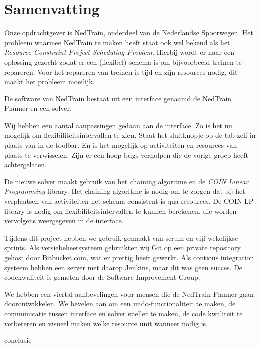 \section*{Samenvatting}

Onze opdrachtgever is NedTrain, onderdeel van de Nederlandse Spoorwegen. Het probleem waarmee NedTrain te maken heeft staat ook wel bekend als het \emph{Resource Constraint Project Scheduling Problem}. Hierbij wordt er naar een oplossing gezocht zodat er een (flexibel) schema is om bijvoorbeeld treinen te repareren. Voor het repareren van treinen is tijd en zijn resources nodig, dit maakt het probleem moeilijk. 

De software van NedTrain bestaat uit een interface genaamd de NedTrain Planner en een solver. 

Wij hebben een aantal aanpassingen gedaan aan de interface. Zo is het nu mogelijk om flexibiliteitsintervallen te zien. Staat het sluitknopje op de tab zelf in plaats van in de toolbar. En is het mogelijk op activiteiten en resources van plaats te verwisselen. Zijn er een hoop bugs verholpen die de vorige groep heeft achtergelaten. 

De nieuwe solver maakt gebruik van het chaining algoritme en de \emph{COIN Linear Programming} library. Het chaining algoritme is nodig om te zorgen dat bij het verplaatsen van activiteiten het schema consistent is qua resources. De COIN LP library is nodig om flexibiliteitsintervallen te kunnen berekenen, die worden vervolgens weergegeven in de interface. 

Tijdens dit project hebben we gebruik gemaakt van scrum en vijf wekelijkse sprints. Als versiebeheersysteem gebruikten wij Git op een private repository gehost door \href{http://bitbucket.com}{Bitbucket.com}, wat er prettig heeft gewerkt. Als contious integration systeem hebben een server met daarop Jenkins, maar dit was geen succes. De codekwaliteit is gemeten door de Software Improvement Group. 

We hebben een viertal aanbevelingen voor mensen die de NedTrain Planner gaan doorontwikkelen. We bevelen aan om een undo-functionaliteit te maken, de communicatie tussen interface en solver sneller te maken, de code kwaliteit te verbeteren en visueel maken welke resource unit wanneer nodig is. 

conclusie
